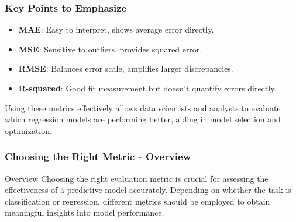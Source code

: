 \documentclass{beamer}
\begin{document}
\begin{frame}[fragile]
    \frametitle{Key Points to Emphasize}
    \begin{itemize}
        \item \textbf{MAE}: Easy to interpret, shows average error directly.
        \item \textbf{MSE}: Sensitive to outliers, provides squared error.
        \item \textbf{RMSE}: Balances error scale, amplifies larger discrepancies.
        \item \textbf{R-squared}: Good fit measurement but doesn’t quantify errors directly.
    \end{itemize}

    Using these metrics effectively allows data scientists and analysts to evaluate which regression models are performing better, aiding in model selection and optimization.
\end{frame}

\begin{frame}[fragile]
    \frametitle{Choosing the Right Metric - Overview}
    \begin{block}{Overview}
    Choosing the right evaluation metric is crucial for assessing the effectiveness of a predictive model accurately. Depending on whether the task is classification or regression, different metrics should be employed to obtain meaningful insights into model performance.
    \end{block}
\end{frame}
\end{document}
